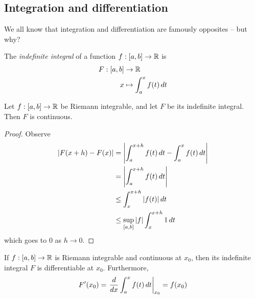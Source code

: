 \documentclass{../template/note}
\begin{document}
    \subsection{Integration and differentiation}

    We all know that integration and differentiation are famously opposites -- but why?

    \begin{definition}
        The \emph{indefinite integral} of a function \(f: [a, b] \to \mathbb R\) is
        \begin{align*}
            F: [a, b] &\to \mathbb R \\
            x &\mapsto \int_a^x f(t) \,d{t}
        \end{align*}
    \end{definition}
    
    \begin{proposition}
        Let \(f: [a, b] \to \mathbb R\) be Riemann integrable, and let \(F\) be its indefinite integral. Then \(F\) is continuous.
    \end{proposition}
    
    \begin{proof}
        Observe
        \begin{align*}
            |F(x+h)-F(x)| &= \left|\int_a^{x+h} f(t) \,d{t} - \int_a^x f(t) \,d{t} \right| \\
            &= \left|\int_a^{x+h} f(t) \,d{t}\right| \\
            &\leq \int_x^{x+h} |f(t)| \,d{t} \\
            &\leq \sup_{[a,b]} |f| \int_x^{x+h} 1 \,d{t}
        \end{align*}
        which goes to 0 as \(h \to 0\).
    \end{proof}
    
    \begin{theorem}
        \label{ftc-1}
        If \(f: [a, b] \to \mathbb R\) is Riemann integrable and continuous at \(x_0\), then its indefinite integral \(F\) is differentiable at \(x_0\). Furthermore,
        \begin{align*}
            F'(x_0) = \left.\frac{d}{dx} \int_a^x f(t) \,d{t}\right|_{x_0} = f(x_0)
        \end{align*}
    \end{theorem}
    
\end{document}
